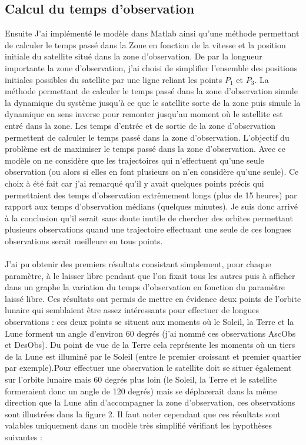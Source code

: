 \documentclass[11pt]{article} %
\begin{document}
		\subsection{Calcul du temps d'observation}
		Ensuite J'ai implémenté le modèle dans Matlab ainsi qu'une méthode permettant de calculer le temps passé dans la \gls{Zone} en fonction de la vitesse et la position initiale du satellite situé dans la zone d'observation. De par la longueur importante la zone d'observation, j'ai choisi de simplifier l'ensemble des positions initiales possibles du satellite par une ligne reliant les points $P_1$ et $P_3$. La méthode permettant de calculer le temps passé dans la zone d'observation simule la dynamique du système jusqu'à ce que le satellite sorte de la zone puis simule la dynamique en sens inverse pour remonter jusqu'au moment où le satellite est entré dans la zone. Les temps d'entrée et de sortie de la zone d'observation permettent de calculer le temps passé dans la zone d'observation. L'objectif du problème est de maximiser le temps passé dans la zone d'observation. Avec ce modèle on ne considère que les trajectoires qui n'effectuent qu'une seule observation (ou alors si elles en font plusieurs on n'en considère qu'une seule). Ce choix à été fait car j'ai remarqué qu'il y avait quelques points précis qui permettaient des temps d'observation extrêmement longs (plus de 15 heures) par rapport aux temps d'observation médians (quelques minutes). Je suis donc arrivé à la conclusion qu'il serait sans doute inutile de chercher des orbites permettant plusieurs observations quand une trajectoire effectuant une seule de ces longues observations serait meilleure en tous points.
		\\ \\
		J'ai pu obtenir des premiers résultats consistant simplement, pour chaque paramètre, à le laisser libre pendant que l'on fixait tous les autres puis à afficher dans un graphe la variation du temps d'observation en fonction du paramètre laissé libre. Ces résultats ont permis de mettre en évidence deux points de l'orbite lunaire qui semblaient être assez intéressants pour effectuer de longues observations : ces deux points se situent aux moments où le Soleil, la Terre et la Lune forment un angle d'environ 60 degrés (j'ai nommé ces observations \gls{AscObs} et \gls{DesObs}). Du point de vue de la Terre cela représente les moments où un tiers de la Lune est illuminé par le Soleil (entre le premier croissant et premier quartier par exemple).Pour effectuer une observation le satellite doit se situer également sur l'orbite lunaire mais 60 degrés plus loin (le Soleil, la Terre et le satellite formeraient donc un angle de 120 degrés) mais se déplacerait dans la même direction que la Lune afin d'accompagner la zone d'observation, ces observations sont illustrées dans la figure 2. Il faut noter cependant que ces résultats sont valables uniquement dans un modèle très simplifié vérifiant les hypothèses suivantes :
\end{document}
